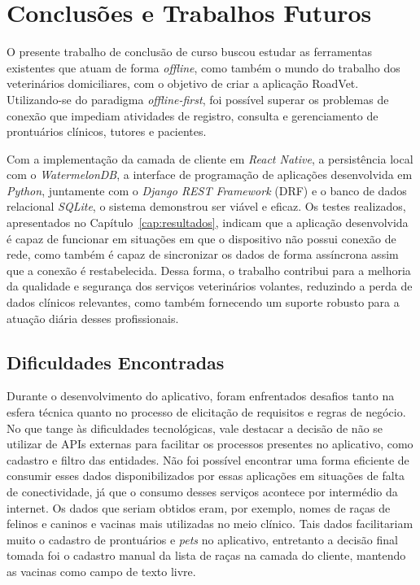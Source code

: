\chapter{Conclusões e Trabalhos Futuros}
\label{cap:conclusao}
O presente trabalho de conclusão de curso buscou estudar as ferramentas existentes que atuam de forma \textit{offline}, como também o mundo do trabalho dos veterinários domiciliares, com o objetivo de criar a aplicação RoadVet. Utilizando-se do paradigma \textit{offline-first}, foi possível superar os problemas de conexão que impediam atividades de registro, consulta e gerenciamento de prontuários clínicos, tutores e pacientes.

Com a implementação da camada de cliente em \textit{React Native}, a persistência local com o \textit{WatermelonDB}, a interface de programação de aplicações desenvolvida em \textit{Python}, juntamente com o \textit{Django REST Framework} (DRF) e o banco de dados relacional \textit{SQLite}, o sistema demonstrou ser viável e eficaz. Os testes realizados, apresentados no Capítulo~\ref{cap:resultados}, indicam que a aplicação desenvolvida é capaz de funcionar em situações em que o dispositivo não possui conexão de rede, como também é capaz de sincronizar os dados de forma assíncrona assim que a conexão é restabelecida. Dessa forma, o trabalho contribui para a melhoria da qualidade e segurança dos serviços veterinários volantes, reduzindo a perda de dados clínicos relevantes, como também fornecendo um suporte robusto para a atuação diária desses profissionais.

\section{Dificuldades Encontradas}
Durante o desenvolvimento do aplicativo, foram enfrentados desafios tanto na esfera técnica quanto no processo de elicitação de requisitos e regras de negócio. No que tange às dificuldades tecnológicas, vale
destacar a decisão de não se utilizar de APIs externas para facilitar os processos presentes no aplicativo, como cadastro e filtro das entidades. Não foi possível encontrar uma forma eficiente de consumir esses dados disponibilizados por essas aplicações em situações de falta de conectividade, já que o consumo desses serviços acontece por intermédio da internet. Os dados que seriam obtidos eram, por exemplo, nomes de raças de felinos e caninos e vacinas mais utilizadas no meio clínico. Tais dados facilitariam muito o cadastro de prontuários e \textit{pets} no aplicativo, entretanto a decisão final tomada foi o cadastro manual da lista de raças na camada do cliente, mantendo as vacinas como campo de texto livre.

